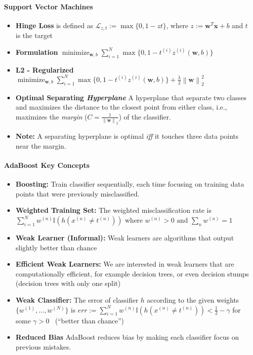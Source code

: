 \documentclass[10pt]{article}
\newcommand{\norm}[1]{\left\lVert#1\right\rVert}
\newcommand{\bw}{\mathbf{w}}
\newcommand{\bx}{\mathbf{x}}
\begin{document}
\paragraph{Support Vector Machines}
\begin{itemize}
    \setlength\itemsep{-0.45em}
    \item \textbf{Hinge Loss} is defined as $\mathcal{L}_{z, t}:= \max \{0, 1- zt\}$, where $z:= \bw^T \bx + b$ and $t$ is the target
    \item \textbf{Formulation} $\operatorname{minimize}_{\bw, b} \sum_{i =1}^N\max\{0, 1 - t^{(i)}z^{(i)}(\bw, b)\}$ 
    \item \textbf{L2 - Regularized} $\operatorname{minimize}_{\bw, b} \sum_{i =1}^N\max\{0, 1 - t^{(i)}z^{(i)}(\bw, b)\} + \frac{\lambda}{2} \norm{\bw}^2_2$
    \item \textbf{Optimal Separating \textit{Hyperplane}} A hyperplane that separate two classes and maximizes the distance to the closest point from either class, i.e., maximizes the \textit{margin} ($C = \frac{1}{\norm{\bw}_2}$) of the classifier. 
    \item \textbf{Note:} A separating hyperplane is optimal \textit{iff} it touches three data points near the margin. 
\end{itemize}

\paragraph{AdaBoost Key Concepts}
\begin{itemize}
    \setlength\itemsep{-0.45em}
    \item \textbf{Boosting:} Train classifier sequentially, each time focusing on training data points that were previously misclassified. 
    \item \textbf{Weighted Training Set:} The weighted misclassification rate is $\sum_{i = 1}^N w^{(n)} \mathbb{I}(h(x^{(n)} \neq t^{(n)}))$ where $w^{(n)} > 0 \text{ and } \sum_n w^{(n)} = 1$
    \item \textbf{Weak Learner (Informal):} Weak learners are algorithms that output slightly better than chance
    \item \textbf{Efficient Weak Learners:} We are interested in weak learners that are computationally efficient, for example decision trees, or even decision stumps (decision trees with only one split) 
    \item \textbf{Weak Classifier:} The error of classifier $h$ according to the given weights $\{w^{(1)},...,w^{(N)}\}$ is $err:= \sum_{i = 1}^N w^{(n)} \mathbb{I}(h(x^{(n)} \neq t^{(n)})) < \frac{1}{2} - \gamma$ for some $\gamma >0$ ~(``better than chance'')
    \item \textbf{Reduced Bias} AdaBoost reduces bias by making each classifier focus on previous mistakes. 
\end{itemize}
\end{document}
